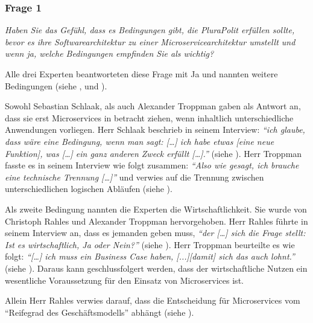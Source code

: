\subsubsection{Frage 1}

\textit{Haben Sie das Gefühl, dass es Bedingungen gibt, die PluraPolit erfüllen sollte, bevor es ihre Softwarearchitektur zu einer Microservicearchitektur umstellt und wenn ja, welche Bedingungen empfinden Sie als wichtig?}

Alle drei Experten beantworteten diese Frage mit Ja und nannten weitere Bedingungen (siehe ,  und ).

Sowohl Sebastian Schlaak, als auch Alexander Troppman gaben als Antwort an, dass sie erst Microservices in betracht ziehen, wenn inhaltlich unterschiedliche Anwendungen vorliegen. Herr Schlaak beschrieb in seinem Interview: \textit{\enquote{ich glaube, dass wäre eine Bedingung, wenn man sagt: […] ich habe etwas [eine neue Funktion], was […] ein ganz anderen Zweck erfüllt […].}} (siehe ). Herr Troppman fasste es in seinem Interview wie folgt zusammen:  \textit{\enquote{Also wie gesagt, ich brauche eine technische Trennung […]}} und verwies auf die Trennung zwischen unterschiedlichen logischen Abläufen (siehe ).

Als zweite Bedingung nannten die Experten die Wirtschaftlichkeit. Sie wurde  von Christoph Rahles und Alexander Troppman hervorgehoben. Herr Rahles führte in seinem Interview an, dass es jemanden geben muss, \textit{\enquote{der […] sich die Frage stellt: Ist es wirtschaftlich, Ja oder Nein?}} (siehe ). Herr Troppman beurteilte es wie folgt: \textit{\enquote{[…] ich muss ein Business Case haben, [...][damit] sich das auch lohnt.}} (siehe ). Daraus kann geschlussfolgert werden, dass der wirtschaftliche Nutzen ein wesentliche Voraussetzung für den Einsatz von Microservices ist.

Allein Herr Rahles verwies darauf, dass die Entscheidung für Microservices vom “Reifegrad des Geschäftsmodells” abhängt (siehe ).
